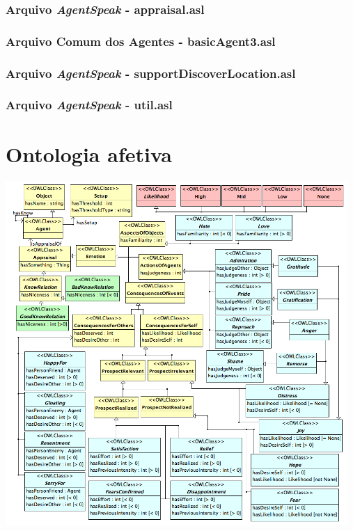\subsection*{Arquivo \emph{AgentSpeak} - appraisal.asl}


\subsection*{Arquivo Comum dos Agentes - basicAgent3.asl}


%
%
\subsection*{Arquivo \emph{AgentSpeak} - supportDiscoverLocation.asl}


\subsection*{Arquivo \emph{AgentSpeak} - util.asl}



\chapter{Ontologia afetiva}

\includegraphics[width=13cm]{figuras/locc-uml3.png}

